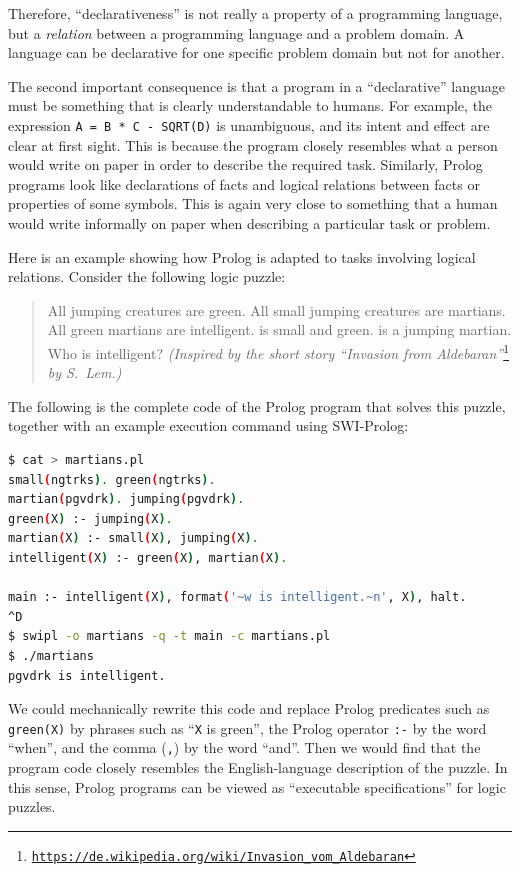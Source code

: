 Therefore, \textsf{``}declarativeness\textsf{''} is not really a property of a programming
language, but a \emph{relation} between a programming language and
a problem domain. A language can be declarative for one specific problem
domain but not for another.

The second important consequence is that a program in a \textsf{``}declarative\textsf{''}
language must be something that is clearly understandable to humans.
For example, the expression \lstinline!A = B * C - SQRT(D)! is unambiguous,
and its intent and effect are clear at first sight. This is because
the program closely resembles what a person would write on paper in
order to describe the required task. Similarly, Prolog programs look
like declarations of facts and logical relations between facts or
properties of some symbols. This is again very close to something
that a human would write informally on paper when describing a particular
task or problem.

Here is an example showing how Prolog is adapted to tasks involving
logical relations. Consider the following logic puzzle:
\begin{quotation}
All jumping creatures are green. All small jumping creatures are martians.
All green martians are intelligent.  is small and green.
 is a jumping martian. Who is intelligent? \emph{(Inspired
by the short story \textsf{``}Invasion from Aldebaran\textsf{''}}\footnote{\texttt{\href{https://de.wikipedia.org/wiki/Invasion_vom_Aldebaran}{https://de.wikipedia.org/wiki/Invasion\_vom\_Aldebaran}}}\emph{
by S.~Lem.)}
\end{quotation}
The following is the complete code of the Prolog program that solves
this puzzle, together with an example execution command using SWI-Prolog:
\begin{lstlisting}[language=bash]
$ cat > martians.pl
small(ngtrks). green(ngtrks).
martian(pgvdrk). jumping(pgvdrk).
green(X) :- jumping(X).
martian(X) :- small(X), jumping(X).
intelligent(X) :- green(X), martian(X).

main :- intelligent(X), format('~w is intelligent.~n', X), halt.
^D
$ swipl -o martians -q -t main -c martians.pl
$ ./martians
pgvdrk is intelligent.
\end{lstlisting}
We could mechanically rewrite this code and replace Prolog predicates
such as \lstinline!green(X)! by phrases such as \textsf{``}\lstinline!X!
is green\textsf{''}, the Prolog operator \lstinline!:-! by the word \textsf{``}when\textsf{''},
and the comma (\lstinline!,!) by the word \textsf{``}and\textsf{''}. Then we would
find that the program code closely resembles the English-language
description of the puzzle. In this sense, Prolog programs can be viewed
as \textsf{``}executable specifications\textsf{''} for logic puzzles. 

